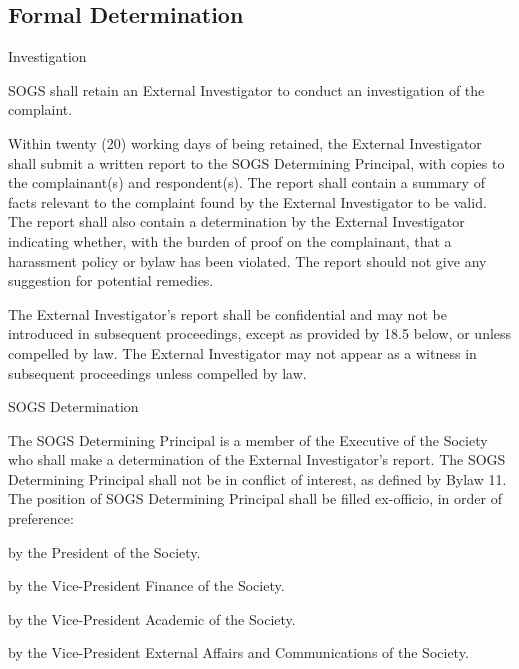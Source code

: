 \subsection{Formal Determination}
\begin{longenum}[ label*=\thesubsection.\arabic*., align=left]
	\item Investigation
    \begin{longenum}[ label*=\arabic*., align=left]
		\item SOGS shall retain an External Investigator to conduct an investigation of the complaint.
        \item Within twenty (20) working days of being retained, the External Investigator shall submit a written report to the SOGS Determining Principal, with copies to the complainant(s) and respondent(s). The report shall contain a summary of facts relevant to the complaint found by the External Investigator to be valid. The report shall also contain a determination by the External Investigator indicating whether, with the burden of proof on the complainant, that a harassment policy or bylaw has been violated. The report should not give any suggestion for potential remedies.
        \item The External Investigator's report shall be confidential and may not be introduced in subsequent proceedings, except as provided by 18.5 below, or unless compelled by law. The External Investigator may not appear as a witness in subsequent proceedings unless compelled by law. 		\end{longenum}
    \item SOGS Determination
    \begin{longenum}[ label*=\arabic*., align=left]
		\item The SOGS Determining Principal is a member of the Executive of the Society who shall make a determination of the External Investigator's report. The SOGS Determining Principal shall not be in conflict of interest, as defined by Bylaw 11. The position of SOGS Determining Principal shall be filled ex-officio, in order of preference: 
        \begin{longenum}[ label*=\arabic*., align=left]
			\item by the President of the Society.
            \item by the Vice-President Finance of the Society.
            \item by the Vice-President Academic of the Society.
            \item by the Vice-President External Affairs and Communications of the Society.

\end{longenum}
\end{longenum}
\end{longenum}
